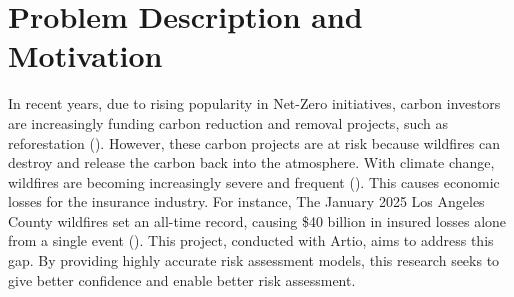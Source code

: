 \documentclass[a4paper, 11pt]{article}
\begin{document}
\nopagebreak

\begin{abstract}
Wildfires are destructive and a rapidly evolving hazard. With climate change, they become increasingly severe and frequent. This increases the need for a higher-resolution wildfire data for better monitoring and risk assessment. Geostationary satellites (GEO) have high-temporal resolution, but lacks the resolution needed for a detailed wildfire risk assessment. While low orbit satellites (LEO) provide better spatial resolution, but low temporal resolution to monitor rapid wildfire spread. Existing downscaling models have demonstrated their effectiveness in producing high-resolution remote sensing data. But many still suffers from artefacts, blurriness, and hallucinations. This project aims to achieve a high-resolution spatial downscaling of wildfire data by integrating additional physical covariates to the model, such as topography and landcover to mitigate physically implausible outputs. The project compares direct (2km to 30m) and cascaded (2km to 375m to 30m) downscaling pipelines and their effectiveness in producing high-fidelity, high-resolution wildfire data. The project compares diffusion (EDiffSR), attention U-Net (HAUNet), and transformer-based (ESTNet) downscaling models.
\end{abstract}

\tableofcontents
\clearpage

\section{Problem Description and Motivation}
In recent years, due to rising popularity in Net-Zero initiatives, carbon investors are increasingly funding carbon reduction and removal projects, such as reforestation (\cite{InvestmentTrendsOutcomes}). However, these carbon projects are at risk because wildfires can destroy and release the carbon back into the atmosphere. With climate change, wildfires are becoming increasingly severe and frequent (\cite{jonesClimateChangeIncreases,}). This causes economic losses for the insurance industry. For instance, The January 2025 Los Angeles County wildfires set an all-time record, causing \$40 billion in insured losses alone from a single event (\cite{staffHowWildfiresStorms2026}). This project, conducted with Artio, aims to address this gap. By providing highly accurate risk assessment models, this research seeks to give better confidence and enable better risk assessment.
\end{document}
